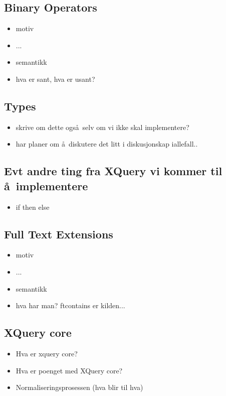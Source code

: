 \subsection{Binary Operators}

\begin{itemize}
\item motiv
\item ...
\item semantikk
\item hva er sant, hva er usant?
\end{itemize}

\subsection{Types}
\begin{itemize}
  \item skrive om dette ogs\aa~selv om vi ikke skal implementere?
  \item har planer om \aa~diskutere det litt i diskusjonskap iallefall..
\end{itemize}

\subsection{Evt andre ting fra XQuery vi kommer til \aa~implementere}

\begin{itemize}
\item if then else

\end{itemize}

\subsection{Full Text Extensions}

\begin{itemize}
\item motiv
\item ...
\item semantikk
\item hva har man? ftcontains er kilden...
\end{itemize}

\subsection{XQuery core}
\label{sect:theory:xqXQcore}
\begin{itemize}
  \item Hva er xquery core?
  \item Hva er poenget med XQuery core?
  \item Normaliseringsprosessen (hva blir til hva)
\end{itemize}

